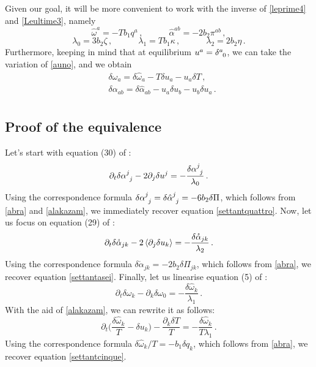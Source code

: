 \documentclass[a4paper, amsfonts, amssymb, amsmath, reprint, showkeys, nofootinbib, twoside, onecolumn, notitlepage]{revtex4-1}
\newcommand{\spc}{\quad \quad \quad}
\theoremstyle{definition}
\theoremstyle{theorem}
\begin{document}
Given our goal, it will be more convenient to work with the inverse of \eqref{leprime4} and \eqref{Leultime3}, namely
\begin{equation}\label{abra}
\hat{\omega}^a = -T b_1 q^a \, , \spc \hat{\alpha}^{ab}=-2b_2 \pi^{ab} \, ,
\end{equation}
\begin{equation}\label{cadabra}
\lambda_0 = 3 b_2 \zeta \, ,  \spc \lambda_1 = Tb_1 \kappa \, , \spc \lambda_2 = 2 b_2 \eta \, .
\end{equation}
Furthermore, keeping in mind that at equilibrium $u^a = \delta\indices{^a _0}$, we can take the variation of \eqref{auno}, and we obtain
\begin{equation}\label{alakazam}
\begin{split}
& \delta \omega_a =\delta \hat{\omega}_a -T \delta u_a-u_a \delta T  \, , \\  
& \delta\alpha_{ab}=  \delta\hat{\alpha}_{ab} -u_a \delta u_b - u_b \delta u_a \, . \\
\end{split}
\end{equation}

\subsection{Proof of the equivalence}

Let's start with equation (30) of \citet{Stricker2019}:
\begin{equation}
\partial_t \delta \alpha\indices{^j _j} - 2\partial_j \delta u^j = -\dfrac{\delta \alpha\indices{^j _j}}{\lambda_0} \, . 
\end{equation}
Using the correspondence formula $\delta \alpha\indices{^j _j}=\delta \hat{\alpha}\indices{^j _j}= -6b_2  \delta \Pi$, which follows from \eqref{abra} and \eqref{alakazam}, we immediately recover equation \eqref{settantquattro}. Now, let us focus on equation (29) of \cite{Stricker2019}:
\begin{equation}
\partial_t \delta \mathring{\alpha}_{jk} -2 \braket{\partial_j \delta u_k} = -\dfrac{\delta\mathring{\alpha}_{jk}}{\lambda_2} \, .
\end{equation}
Using the correspondence formula $\delta\mathring{\alpha}_{jk}= -2b_2 \delta \Pi_{jk}$, which follows from \eqref{abra}, we recover equation  \eqref{settantasei}. Finally, let us linearise equation (5) of \cite{Stricker2019}:
\begin{equation}
\partial_t \delta \omega_k -\partial_k \delta \omega_0 = -\dfrac{\delta \hat{\omega}_k}{\lambda_1} \, .
\end{equation}
With the aid of \eqref{alakazam}, we can rewrite it as follows:
\begin{equation}
\partial_t \bigg( \dfrac{\delta \hat{\omega}_k}{T} - \delta u_k \bigg) -\dfrac{\partial_ k \delta T}{T} = -\dfrac{\delta \hat{\omega}_k}{T\lambda_1} \, .
\end{equation}
Using the correspondence formula $\delta \hat{\omega}_k/T = -b_1 \delta q_k$, which follows from \eqref{abra}, we recover equation \eqref{settantcinque}.
\end{document}
